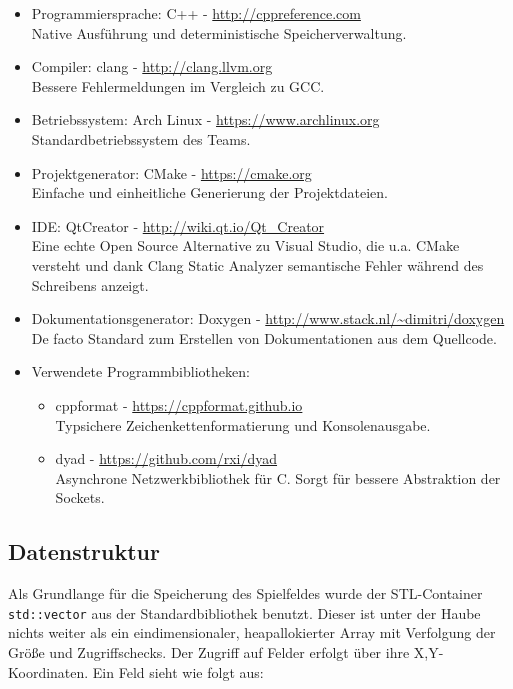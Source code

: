 \documentclass[12pt,a4paper]{article}
\begin{document}
\begin{itemize}
\item Programmiersprache: C++ - \url{http://cppreference.com} \\
Native Ausführung und deterministische Speicherverwaltung.
\item Compiler: clang - \url{http://clang.llvm.org} \\
Bessere Fehlermeldungen im Vergleich zu GCC.
\item Betriebssystem: Arch Linux - \url{https://www.archlinux.org} \\
Standardbetriebssystem des Teams.
\item Projektgenerator: CMake - \url{https://cmake.org} \\
Einfache und einheitliche Generierung der Projektdateien.
\item IDE: QtCreator - \url{http://wiki.qt.io/Qt_Creator} \\
Eine echte Open Source Alternative zu Visual Studio, die u.a. CMake versteht und dank Clang Static Analyzer semantische Fehler während des Schreibens anzeigt.
\item Dokumentationsgenerator: Doxygen - \url{http://www.stack.nl/~dimitri/doxygen} \\
De facto Standard zum Erstellen von Dokumentationen aus dem Quellcode.

\item Verwendete Programmbibliotheken:
\begin{itemize}
\item cppformat - \url{https://cppformat.github.io} \\
Typsichere Zeichenkettenformatierung und Konsolenausgabe.
\item dyad - \url{https://github.com/rxi/dyad} \\
Asynchrone Netzwerkbibliothek für C. Sorgt für bessere Abstraktion der Sockets.
\end{itemize}

\end{itemize}

\subsection{Datenstruktur}
Als Grundlange für die Speicherung des Spielfeldes wurde der STL-Container \texttt{std::vector} aus der Standardbibliothek benutzt. Dieser ist unter der Haube nichts weiter als ein eindimensionaler, heapallokierter Array mit Verfolgung der Größe und Zugriffschecks. Der Zugriff auf Felder erfolgt über ihre X,Y-Koordinaten.
Ein Feld sieht wie folgt aus:
\end{document}
